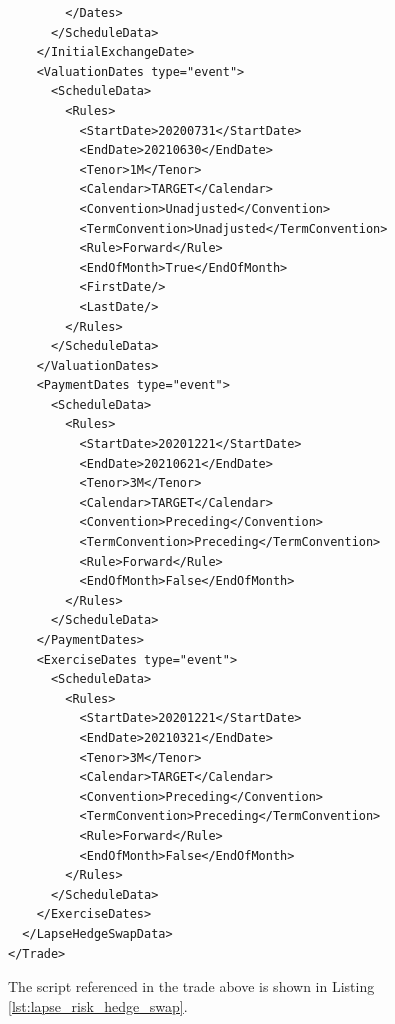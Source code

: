 \begin{verbatim}
        </Dates>
      </ScheduleData>
    </InitialExchangeDate>
    <ValuationDates type="event">
      <ScheduleData>
        <Rules>
          <StartDate>20200731</StartDate>
          <EndDate>20210630</EndDate>
          <Tenor>1M</Tenor>
          <Calendar>TARGET</Calendar>
          <Convention>Unadjusted</Convention>
          <TermConvention>Unadjusted</TermConvention>
          <Rule>Forward</Rule>
          <EndOfMonth>True</EndOfMonth>
          <FirstDate/>
          <LastDate/>
        </Rules>
      </ScheduleData>
    </ValuationDates>
    <PaymentDates type="event">
      <ScheduleData>
        <Rules>
          <StartDate>20201221</StartDate>
          <EndDate>20210621</EndDate>
          <Tenor>3M</Tenor>
          <Calendar>TARGET</Calendar>
          <Convention>Preceding</Convention>
          <TermConvention>Preceding</TermConvention>
          <Rule>Forward</Rule>
          <EndOfMonth>False</EndOfMonth>
        </Rules>
      </ScheduleData>
    </PaymentDates>
    <ExerciseDates type="event">
      <ScheduleData>
        <Rules>
          <StartDate>20201221</StartDate>
          <EndDate>20210321</EndDate>
          <Tenor>3M</Tenor>
          <Calendar>TARGET</Calendar>
          <Convention>Preceding</Convention>
          <TermConvention>Preceding</TermConvention>
          <Rule>Forward</Rule>
          <EndOfMonth>False</EndOfMonth>
        </Rules>
      </ScheduleData>
    </ExerciseDates>
  </LapseHedgeSwapData>
</Trade>
\end{verbatim}

The script referenced in the trade above is shown in Listing \ref{lst:lapse_risk_hedge_swap}.

